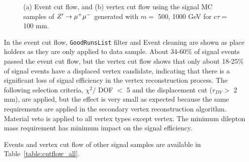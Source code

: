 \begin{figure}[!htb]
    \centering
    \caption{(a) Event cut flow, and (b) vertex cut flow using the signal MC samples of $Z'\rightarrow \mu^{+}\mu^{-}$ generated with $m =$ 500, 1000 GeV for $c\tau= $ 100 mm.}
    \label{fig:signal_cutflow_MC_mumu}
\end{figure}

In the event cut flow, \texttt{GoodRunsList} filter and Event cleaning are shown as place holders as they are only applied to data sample. About 34-60$\%$ of signal events passed the event cut flow, but the vertex cut flow shows that only about 18-25$\%$ of signal events have a displaced vertex candidate, indicating that there is a significant loss of signal efficiency in the vertex reconstruction process. The following selection criteria, $\chi^{2} /$ DOF $<$ 5 and the displacement cut ($r_{DV} > $ 2 mm), are applied, but the effect is very small as expected because the same requirements are applied in the secondary vertex reconstruction algorithm. Material veto is applied to all vertex types except \mumu vertex. The minimum dilepton mass requirement has minimum impact on the signal efficiency.

Events and vertex cut flow of other signal samples are available in Table~\ref{table:cutflow_all}.



